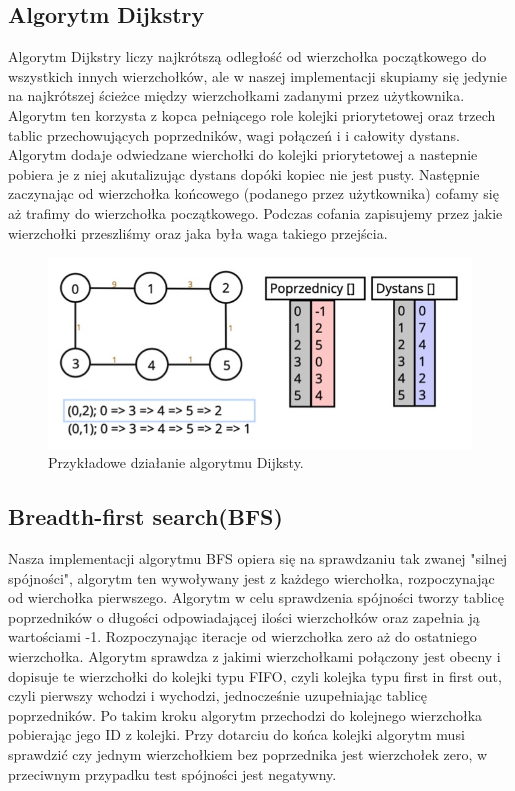 \documentclass[10pt, a4paper]{report}
\begin{document}
    \subsection{Algorytm Dijkstry}
    Algorytm Dijkstry liczy najkrótszą odległość od wierzchołka początkowego do wszystkich innych wierzchołków,
    ale w naszej implementacji skupiamy się jedynie na najkrótszej ścieżce między wierzchołkami zadanymi przez
    użytkownika. Algorytm ten korzysta z kopca pełniącego role kolejki priorytetowej oraz trzech tablic przechowujących
    poprzedników, wagi połączeń i i całowity dystans.
    Algorytm dodaje odwiedzane wierchołki do kolejki priorytetowej a nastepnie pobiera je z niej akutalizując dystans
    dopóki kopiec nie jest pusty. Następnie zaczynając od wierzchołka końcowego (podanego przez użytkownika) cofamy się aż trafimy do wierzchołka początkowego.
    Podczas cofania zapisujemy przez jakie wierzchołki przeszliśmy oraz jaka była waga takiego przejścia.
    \begin{figure}[h]
      \begin{center}
          \includegraphics[scale=0.5]{dijkstra.png}
          \caption{Przykładowe działanie algorytmu Dijksty.}
      \end{center}
  \end{figure}
  \newpage

    \subsection{Breadth-first search(BFS)}
    Nasza implementacji algorytmu BFS opiera się na sprawdzaniu tak zwanej "silnej spójności",
    algorytm ten wywoływany jest z każdego wierchołka, rozpoczynając od wierchołka pierwszego.
    Algorytm w celu sprawdzenia spójności tworzy tablicę poprzedników o długości odpowiadającej ilości wierzchołków
    oraz zapełnia ją wartościami -1. Rozpoczynając iteracje od wierzchołka zero aż do ostatniego wierzchołka.
    Algorytm sprawdza z jakimi wierzchołkami połączony jest obecny i dopisuje te wierzchołki do kolejki typu FIFO,
    czyli kolejka typu first in first out, czyli pierwszy wchodzi i wychodzi, jednocześnie uzupełniając tablicę poprzedników.
    Po takim kroku algorytm przechodzi do kolejnego wierzchołka pobierając jego ID z kolejki.
    Przy dotarciu do końca kolejki algorytm musi sprawdzić czy jednym wierzchołkiem bez poprzednika
    jest wierzchołek zero, w przeciwnym przypadku test spójności jest negatywny.
\end{document}
